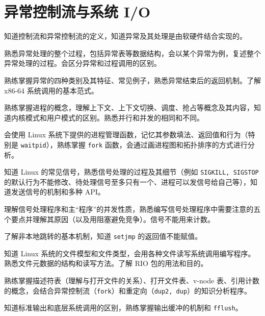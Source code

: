 \chapter{异常控制流与系统 I/O}\thispagestyle{empty}
    \begin{summary}
        \begin{compactitem}
            \item 知道控制流和异常控制流的定义，知道异常及其处理是由软硬件结合实现的。
            \item 熟悉异常处理的整个过程，包括异常表等数据结构，会以某个异常为例，复述整个异常处理的过程。会区分异常和过程调用的区别。
            \item 熟练掌握异常的四种类别及其特征、常见例子，熟悉异常结束后的返回机制。了解 x86-64 系统调用的基本范式。
            \item 熟练掌握进程的概念，理解上下文、上下文切换、调度、抢占等概念及其内容，知道内核模式和用户模式的区别。熟悉并行和并发的相同和不同。
            \item 会使用 Linux 系统下提供的进程管理函数，记忆其参数填法、返回值和行为（特别是 \verb|waitpid|），熟练掌握 \verb|fork| 函数，会通过画进程图和拓扑排序的方式进行分析。
            \item 知道 Linux 的常见信号，熟悉信号处理的过程及其细节（例如 \verb|SIGKILL, SIGSTOP| 的默认行为不能修改、待处理信号至多只有一个、进程可以发信号给自己等），知道发送信号的机制和多种 API。
            \item 理解信号处理程序和主“程序”的并发性质，熟悉编写信号处理程序中需要注意的五个要点并理解其原因（以及用阻塞避免竞争）。信号不能用来计数。
            \item 了解非本地跳转的基本机制，知道 \verb|setjmp| 的返回值不能赋值。
            \item 知道 Linux 系统的文件模型和文件类型，会用各种文件读写系统调用编写程序。熟悉文件元数据的结构和读写方法。了解 RIO 包的用法和目的。
            \item 熟练掌握描述符表（理解与打开文件的关系）、打开文件表、v-node 表、引用计数的概念，会结合异常控制流（\verb|fork|）和重定向（\verb|dup2, dup|）的知识分析程序。
            \item 知道标准输出和底层系统调用的区别，熟练掌握输出缓冲的机制和 \verb|fflush|。
        \end{compactitem}
    \end{summary}

